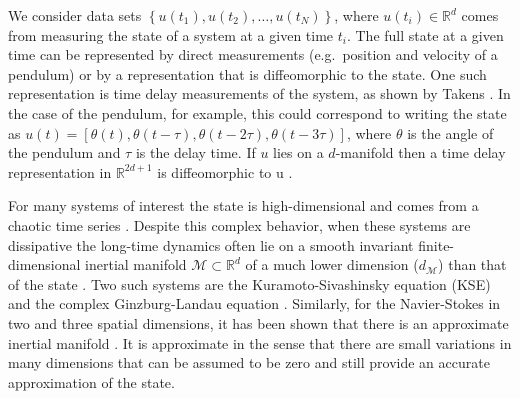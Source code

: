 \documentclass[preprint,aps,pre,letterpaper,onecolumn,superscriptaddress]{revtex4-2} %
\newcommand{\MDG}[1]{\textcolor{magenta}{*** #1 ***}}
\newcommand{\reals}{\mathbb{R}} %
\begin{document}
We consider data sets $\left\{u(t_1), u(t_2), \ldots, u(t_N)\right\}$, where $u(t_i)\in \mathbb{R}^d$  comes from measuring the state of a system at a given time $t_i$. The full state at a given time can be represented by direct measurements (e.g.\ position and velocity of a pendulum) or by a representation that is diffeomorphic to the state. One such representation is time delay measurements of the system, as shown by Takens \citep{Takens}. In the case of the pendulum, for example, this could correspond to writing the state as $u(t)=[\theta(t),\theta(t-\tau),\theta(t-2\tau),\theta(t-3\tau)]$, where $\theta$ is the angle of the pendulum and $\tau$ is the delay time. If $u$ lies on a $d$-manifold then a time delay representation in $\mathbb{R}^{2d+1}$ is diffeomorphic to u \citep{Takens}.  %

For many systems of interest the state is high-dimensional and comes from a chaotic time series \cite{Ivancevic2007}. 
Despite this complex behavior, when these systems are dissipative the long-time dynamics often lie on a smooth invariant finite-dimensional inertial manifold $\mathcal{M} \subset \mathbb{R}^d$ of a much lower dimension ($d_\mathcal{M}$) than that of the state \cite{Temam1990}. 
Two such systems are the Kuramoto-Sivashinsky equation (KSE) \cite{Foias1988a,Temam1994,Jolly2000,Zelik2014} and the complex Ginzburg-Landau equation \cite{Doering1988}. Similarly, for the Navier-Stokes in two and three spatial dimensions, it has been shown that there is an approximate inertial manifold \cite{Foias1988,Temam1989}. It is approximate in the sense that there are small variations in many dimensions that can be assumed to be zero and still provide an accurate approximation of the state.
\end{document}
